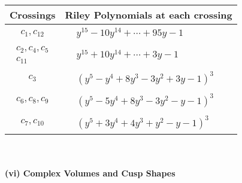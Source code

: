 \documentclass[1p]{elsarticle_modified}
\theoremstyle{definition}
\begin{document}
\begin{tabular}{m{50pt}|m{274pt}}
Crossings & \hspace{64pt}Riley Polynomials at each crossing \\
\hline $$\begin{aligned}c_{1},c_{12}\end{aligned}$$&$\begin{aligned}
&y^{15}-10 y^{14}+\cdots+95 y-1
\end{aligned}$\\
\hline $$\begin{aligned}c_{2},c_{4},c_{5}\\c_{11}\end{aligned}$$&$\begin{aligned}
&y^{15}+10 y^{14}+\cdots+3 y-1
\end{aligned}$\\
\hline $$\begin{aligned}c_{3}\end{aligned}$$&$\begin{aligned}
&(y^5- y^4+8 y^3-3 y^2+3 y-1)^3
\end{aligned}$\\
\hline $$\begin{aligned}c_{6},c_{8},c_{9}\end{aligned}$$&$\begin{aligned}
&(y^5-5 y^4+8 y^3-3 y^2- y-1)^3
\end{aligned}$\\
\hline $$\begin{aligned}c_{7},c_{10}\end{aligned}$$&$\begin{aligned}
&(y^5+3 y^4+4 y^3+y^2- y-1)^3
\end{aligned}$\\
\hline
\end{tabular}\\~\\
\newpage\flushleft \textbf{(vi) Complex Volumes and Cusp Shapes}
\end{document}
